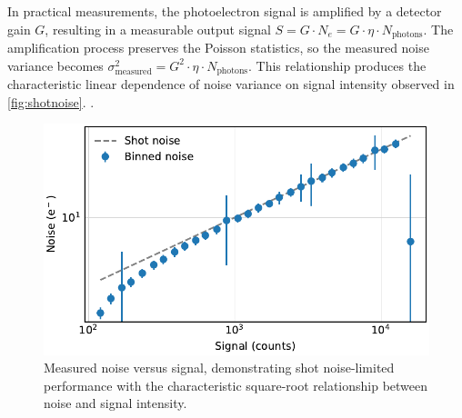 \documentclass[
	parskip=half,
	a4paper,
]{scrarticle}
\begin{document}
In practical measurements, the photoelectron signal is amplified by a detector gain $G$, resulting in a measurable output signal $S = G \cdot N_e = G \cdot \eta \cdot N_{\text{photons}}$. The amplification process preserves the Poisson statistics, so the measured noise variance becomes $\sigma^2_{\text{measured}} = G^2 \cdot \eta \cdot N_{\text{photons}}$. This relationship produces the characteristic linear dependence of noise variance on signal intensity observed in \autoref{fig:shotnoise}. \cite{european_machine_vision_association_standard_2010}.

\begin{figure}
    \centering
    \includegraphics{../analysis/figures/shot noise.pdf}
    \caption{Measured noise versus signal, demonstrating shot noise-limited performance with the characteristic square-root relationship between noise and signal intensity.}
    \label{fig:shotnoise}
\end{figure}



\end{document}

